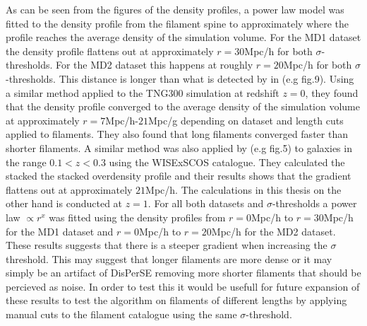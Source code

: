 As can be seen from the figures of the density profiles, a power law model was fitted to the density profile from the filament spine to approximately where the profile reaches the average density of the simulation volume. For the MD1 dataset the density profile flattens out at approximately $r=30$Mpc/h for both $\sigma$-thresholds. For the MD2 dataset this happens at roughly $r=20$Mpc/h for both $\sigma$-thresholds. This distance is longer than what is detected by in \cite{Gal_rraga_Espinosa_2020} (e.g fig.9). Using a similar method applied to the TNG300 simulation \cite{nelson2021illustristng} at redshift $z=0$, they found that the density profile converged to the average density of the simulation volume at approximately $r=7$Mpc/h-$21$Mpc/g depending on dataset and length cuts applied to filaments. They also found that long filaments converged faster than shorter filaments. A similar method was also applied by \cite{bonjean} (e.g fig.5) to galaxies in the range $0.1<z<0.3$ using the WISExSCOS catalogue\cite{Bilicki_2016}. They calculated the stacked the stacked overdensity profile and their results shows that the gradient flattens out at approximately $21$Mpc/h. The calculations in this thesis on the other hand is conducted at $z=1$. For all both datasets and $\sigma$-thresholds a power law $\propto r^x$ was fitted using the density profiles from $r=0$Mpc/h to $r=30$Mpc/h for the MD1 dataset and $r=0$Mpc/h to $r=20$Mpc/h for the MD2 dataset. These results suggests that there is a steeper gradient when increasing the $\sigma$ threshold. This may suggest that longer filaments are more dense or it may simply be an artifact of DisPerSE removing more shorter filaments that should be percieved as noise. In order to test this it would be usefull for future expansion of these results to test the algorithm on filaments of different lengths by applying manual cuts to the filament catalogue using the same $\sigma$-threshold.\\\indent
